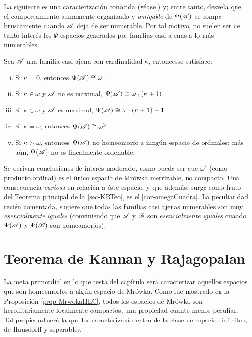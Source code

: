 La siguiente es una caracterización conocida (véase \cite[p.~39,45]{GeorginaTesis}) y; entre tanto, desvela que el comportamiento sumamente organizado y \textit{amigable} de $\Psi(\mathscr{A})$ se rompe bruscamente cuando $\mathscr{A}$ deja de ser numerable. Por tal motivo, no suelen ser de tanto interés los $\Psi$-espacios generados por familias casi ajenas a lo más numerables.

\begin{proposicion}\label{prop-alomasNumCaract}
	Sea $\mathscr{A}$ una familia casi ajena con cardinalidad $\kappa$, entonces\footnotemark se satisface:
	\begin{enumerate}[i)]
		\item Si $\kappa=0$, entonces $\Psi(\mathscr{A}) \cong \omega$.
		\item Si $\kappa \in \omega$ y $\mathscr{A}$ no es maximal, $\Psi(\mathscr{A}) \cong \omega \cdot (\kappa+1)$.
		\item Si $\kappa \in \omega$ y $\mathscr{A}$ es maximal, $\Psi(\mathscr{A}) \cong \omega \cdot (\kappa+1)+1$.
		\item Si $\kappa=\omega$, entonces $\Psi(\mathscr{A}) \cong \omega^2$.
		\item Si $\kappa>\omega$, entonces $\Psi(\mathscr{A})$ no homeomorfo a ningún espacio de ordinales; más aún, $\Psi(\mathscr{A})$ no es linealmente ordenable.
	\end{enumerate}
\end{proposicion}


Se derivan conclusiones de interés moderado, como puede ser que $\omega^2$ (como producto ordinal) es el único espacio de Mrówka metrizable, no compacto. Una consecuencia \textit{curiosa} en relación a éste espacio; y que además, surge como fruto del Teorema principal de la \autoref{sec-KRTeo}, es el \autoref{cor-omegaCuadra}.
\label{Dif-esencial}
La peculiaridad recién comentada, sugiere que todas las familias casi ajenas numerables son muy \textit{esencialmente iguales} (conviniendo que $\mathscr{A}$ y $\mathscr{B}$ son \textit{esencialmente iguales} cuando $\Psi(\mathscr{A})$ y $\Psi(\mathscr{B})$ son homeomorfos).

\section{Teorema de Kannan y Rajagopalan}
\label{sec-KRTeo}
La meta primordial en lo que resta del capítulo será caracterizar aquellos espacios que son homeomorfos a algún espacio de Mrówka. Como fue mostrado en la Proposición \ref{prop-MrwokaHLC}, todos los espacios de Mrówka son hereditariamente localmente compactos, una propiedad cuanto menos peculiar. Tal propiedad será la que los caracterizará dentro de la clase de espacios infinitos, de Hausdorff y separables.

